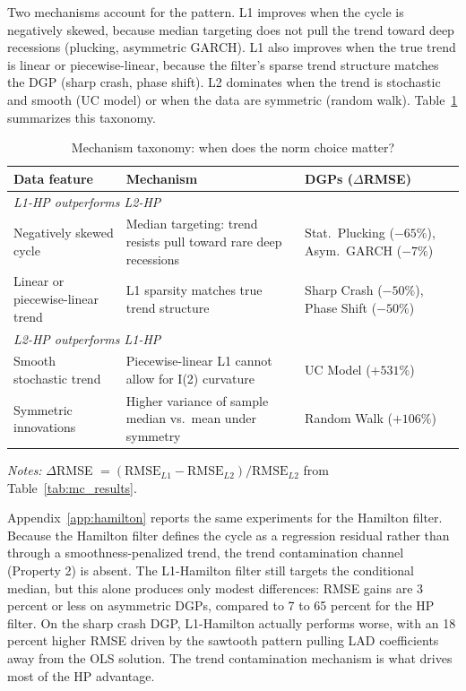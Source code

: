 \documentclass[10pt]{article}
\begin{document}
Two mechanisms account for the pattern. L1 improves when the cycle is negatively skewed, because median targeting does not pull the trend toward deep recessions (plucking, asymmetric GARCH). L1 also improves when the true trend is linear or piecewise-linear, because the filter's sparse trend structure matches the DGP (sharp crash, phase shift). L2 dominates when the trend is stochastic and smooth (UC model) or when the data are symmetric (random walk). Table~\ref{tab:mechanism_map} summarizes this taxonomy.

\begin{table}[htbp]
\centering
\caption{Mechanism taxonomy: when does the norm choice matter?}
\label{tab:mechanism_map}
\begin{tabular}{p{3.5cm} p{5.5cm} p{3.5cm}}
\toprule
Data feature & Mechanism & DGPs ($\Delta$RMSE) \\
\midrule
\multicolumn{3}{l}{\textit{L1-HP outperforms L2-HP}} \\[4pt]
Negatively skewed cycle        & Median targeting: trend resists pull toward rare deep recessions & Stat.\ Plucking ($-65\%$), Asym.\ GARCH ($-7\%$) \\[6pt]
Linear or piecewise-linear trend & L1 sparsity matches true trend structure                       & Sharp Crash ($-50\%$), Phase Shift ($-50\%$) \\[4pt]
\midrule
\multicolumn{3}{l}{\textit{L2-HP outperforms L1-HP}} \\[4pt]
Smooth stochastic trend        & Piecewise-linear L1 cannot allow for I(2) curvature          & UC Model ($+531\%$) \\[6pt]
Symmetric innovations          & Higher variance of sample median vs.\ mean under symmetry      & Random Walk ($+106\%$) \\
\bottomrule
\end{tabular}
\begin{tablenotes}
\small
\item \textit{Notes:} $\Delta$RMSE $= (\text{RMSE}_{L1} - \text{RMSE}_{L2}) / \text{RMSE}_{L2}$ from Table~\ref{tab:mc_results}.
\end{tablenotes}
\end{table}

Appendix~\ref{app:hamilton} reports the same experiments for the Hamilton filter. Because the Hamilton filter defines the cycle as a regression residual rather than through a smoothness-penalized trend, the trend contamination channel (Property 2) is absent. The L1-Hamilton filter still targets the conditional median, but this alone produces only modest differences: RMSE gains are 3 percent or less on asymmetric DGPs, compared to 7 to 65 percent for the HP filter. On the sharp crash DGP, L1-Hamilton actually performs worse, with an 18 percent higher RMSE driven by the sawtooth pattern pulling LAD coefficients away from the OLS solution. The trend contamination mechanism is what drives most of the HP advantage.
\end{document}
